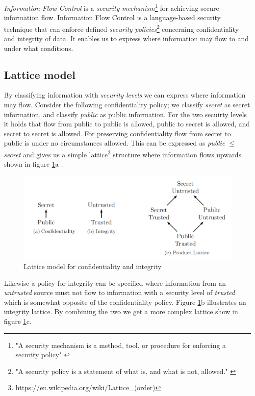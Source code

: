 \emph{Information Flow Control} is a \emph{security mechanism}\footnote{"A security mechanism is a method, tool, or procedure for enforcing a security policy" \cite{Bishop2004}} for achieving secure information flow.
Information Flow Control is a language-based security technique that can enforce defined \emph{security policies}\footnote{"A security policy is a statement of what is, and what is not, allowed." \cite{Bishop2004}} concerning confidentiality and integrity of data. It enables us to express where information may flow to and under what conditions. 

\subsection{Lattice model}\label{lattice}

By classifying information with \emph{security levels} we can express where information may flow. Consider the following confidentiality policy; we classify \emph{secret} as secret information, and classify \emph{public} as public information. For the two secuirty levels it holds that flow from public to public is allowed, public to secret is allowed, and secret to secret is allowed. For preserving confidentiality flow from secret to public is under no circumstances allowed.  This can be expressed as \emph{public $\leq$ secret} and gives us a simple lattice\footnote{https://en.wikipedia.org/wiki/Lattice\_(order)} structure where information flows upwards shown in figure \ref{fig:lattice}a \cite{Smith}.


\begin{figure}[H]
	\centering
	\includegraphics[width=12cm]{figures/lattice.png}
	\caption{ Lattice model for confidentiality and integrity \cite{Musard2014}}
	\label{fig:lattice}
\end{figure}

Likewise a policy for integrity can be specified where information from an \emph{untrusted} source must not flow to information with a security level of \emph{trusted} which is somewhat opposite of the confidentiality policy. Figure \ref{fig:lattice}b illustrates an integrity lattice. By combining the two we get a more complex lattice show in figure \ref{fig:lattice}c.

